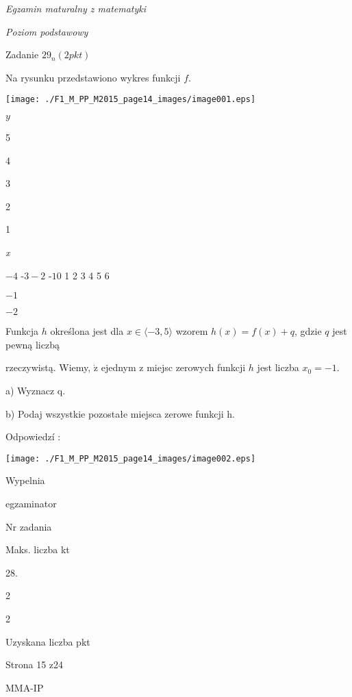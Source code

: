 \documentclass[a4paper,12pt]{article}
\begin{document}
{\it Egzamin maturalny z matematyki}

{\it Poziom podstawowy}

Zadanie $29_{n}(2pkt)$

Na rysunku przedstawiono wykres funkcji $f.$
\begin{center}
\texttt{[image: ./F1\_M\_PP\_M2015\_page14\_images/image001.eps]}
\end{center}
$y$

5

4

3

2

1

{\it x}

$-4$ -$3  -2$ -$1 0$  1 2  3 4  5 6

$-1$

$-2$

Funkcja $h$ określona jest dla $x\in\langle-3,  5\rangle$ wzorem $h(x)=f(x)+q$, gdzie $q$ jest pewną liczbą

rzeczywistą. Wiemy, $\dot{\mathrm{z}}$ ejednym z miejsc zerowych funkcji $h$ jest liczba $x_{0}=-1.$

a) Wyznacz q.

b) Podaj wszystkie pozostałe miejsca zerowe funkcji h.

Odpowiedzí :
\begin{center}
\texttt{[image: ./F1\_M\_PP\_M2015\_page14\_images/image002.eps]}
\end{center}
Wypelnia

egzaminator

Nr zadania

Maks. liczba kt

28.

2

2

Uzyskana liczba pkt

Strona 15 z24

MMA-IP
\end{document}
